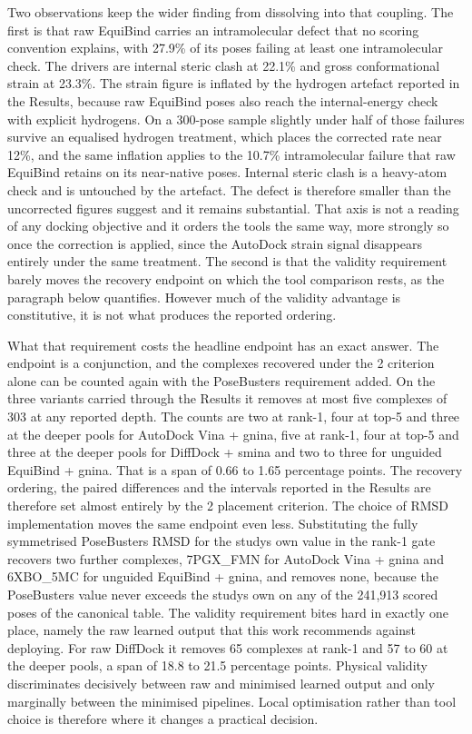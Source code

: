 Two observations keep the wider finding from dissolving into that coupling. The first is that raw EquiBind carries an intramolecular defect that no scoring convention explains, with 27.9\% of its poses failing at least one intramolecular check. The drivers are internal steric clash at 22.1\% and gross conformational strain at 23.3\%. The strain figure is inflated by the hydrogen artefact reported in the Results, because raw EquiBind poses also reach the internal-energy check with explicit hydrogens. On a 300-pose sample slightly under half of those failures survive an equalised hydrogen treatment, which places the corrected rate near 12\%, and the same inflation applies to the 10.7\% intramolecular failure that raw EquiBind retains on its near-native poses. Internal steric clash is a heavy-atom check and is untouched by the artefact. The defect is therefore smaller than the uncorrected figures suggest and it remains substantial. That axis is not a reading of any docking objective and it orders the tools the same way, more strongly so once the correction is applied, since the AutoDock strain signal disappears entirely under the same treatment. The second is that the validity requirement barely moves the recovery endpoint on which the tool comparison rests, as the paragraph below quantifies. However much of the validity advantage is constitutive, it is not what produces the reported ordering.

What that requirement costs the headline endpoint has an exact answer. The endpoint is a conjunction, and the complexes recovered under the 2\angstrom{} criterion alone can be counted again with the PoseBusters requirement added. On the three variants carried through the Results it removes at most five complexes of 303 at any reported depth. The counts are two at rank-1, four at top-5 and three at the deeper pools for AutoDock Vina + gnina, five at rank-1, four at top-5 and three at the deeper pools for DiffDock + smina and two to three for unguided EquiBind + gnina. That is a span of 0.66 to 1.65 percentage points. The recovery ordering, the paired differences and the intervals reported in the Results are therefore set almost entirely by the 2\angstrom{} placement criterion. The choice of RMSD implementation moves the same endpoint even less. Substituting the fully symmetrised PoseBusters RMSD for the study\textquotesingle s own value in the rank-1 gate recovers two further complexes, 7PGX\_FMN for AutoDock Vina + gnina and 6XBO\_5MC for unguided EquiBind + gnina, and removes none, because the PoseBusters value never exceeds the study\textquotesingle s own on any of the 241,913 scored poses of the canonical table. The validity requirement bites hard in exactly one place, namely the raw learned output that this work recommends against deploying. For raw DiffDock it removes 65 complexes at rank-1 and 57 to 60 at the deeper pools, a span of 18.8 to 21.5 percentage points. Physical validity discriminates decisively between raw and minimised learned output and only marginally between the minimised pipelines. Local optimisation rather than tool choice is therefore where it changes a practical decision.

